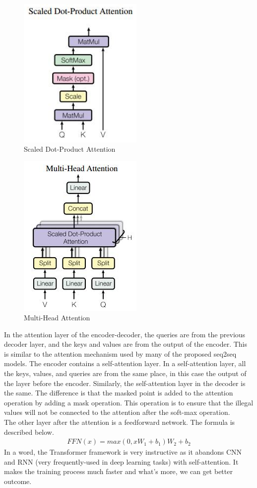 \documentclass{article}
\begin{document}
\begin{figure}[H]
	\centering
	\includegraphics[width=6cm]{attention}
	\caption{Scaled Dot-Product Attention}
	\label{attention}
\end{figure}
\begin{figure}[H]
	\centering
	\includegraphics[width=6cm]{mh-attention}
	\caption{Multi-Head Attention}
	\label{multi-head attention}
\end{figure}
In the attention layer of the encoder-decoder, the queries are from the previous decoder layer, and the keys and values are from the output of the encoder. This is similar to the attention mechanism used by many of the proposed seq2seq models. The encoder contains a self-attention layer. In a self-attention layer, all the keys, values, and queries are from the same place, in this case the output of the layer before the encoder. Similarly, the self-attention layer in the decoder is the same. The difference is that the masked point is added to the attention operation by adding a mask operation. This operation is to ensure that the illegal values will not be connected to the attention after the soft-max operation.\\
The other layer after the attention is a feedforward network. The formula is described below.
\begin{align}
\textit{FFN}(x)=\textit{max}(0,xW_{1}+b_{1})W_{2}+b_{2}
\end{align}
In a word, the Transformer framework is very instructive as it abandons CNN and RNN (very frequently-used in deep learning tasks) with self-attention. It makes the training process much faster and what's more, we can get better outcome.
\end{document}
